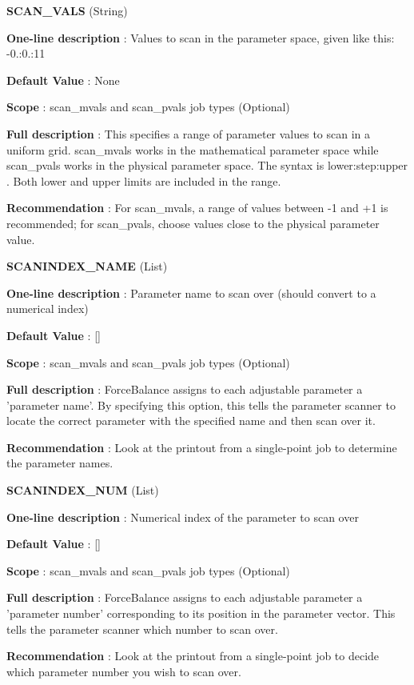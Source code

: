 \begin{DoxyItemize}
\item {\bfseries  \-S\-C\-A\-N\-\_\-\-V\-A\-L\-S } (\-String) \par
{\bfseries  \-One-\/line description }\-: \-Values to scan in the parameter space, given like this\-: -\/0.\-:0.\-:11 \par
{\bfseries  \-Default \-Value }\-: \-None \par
{\bfseries  \-Scope }\-: scan\-\_\-mvals and scan\-\_\-pvals job types (\-Optional) \par
{\bfseries  \-Full description }\-: \-This specifies a range of parameter values to scan in a uniform grid. scan\-\_\-mvals works in the mathematical parameter space while scan\-\_\-pvals works in the physical parameter space. \-The syntax is lower\-:step\-:upper . \-Both lower and upper limits are included in the range. \par
{\bfseries  \-Recommendation }\-: \-For scan\-\_\-mvals, a range of values between -\/1 and +1 is recommended; for scan\-\_\-pvals, choose values close to the physical parameter value.\end{DoxyItemize}
\begin{DoxyItemize}
\item {\bfseries  \-S\-C\-A\-N\-I\-N\-D\-E\-X\-\_\-\-N\-A\-M\-E } (\-List) \par
{\bfseries  \-One-\/line description }\-: \-Parameter name to scan over (should convert to a numerical index) \par
{\bfseries  \-Default \-Value }\-: \mbox{[}\mbox{]} \par
{\bfseries  \-Scope }\-: scan\-\_\-mvals and scan\-\_\-pvals job types (\-Optional) \par
{\bfseries  \-Full description }\-: \-Force\-Balance assigns to each adjustable parameter a 'parameter name'. \-By specifying this option, this tells the parameter scanner to locate the correct parameter with the specified name and then scan over it. \par
{\bfseries  \-Recommendation }\-: \-Look at the printout from a single-\/point job to determine the parameter names.\end{DoxyItemize}
\begin{DoxyItemize}
\item {\bfseries  \-S\-C\-A\-N\-I\-N\-D\-E\-X\-\_\-\-N\-U\-M } (\-List) \par
{\bfseries  \-One-\/line description }\-: \-Numerical index of the parameter to scan over \par
{\bfseries  \-Default \-Value }\-: \mbox{[}\mbox{]} \par
{\bfseries  \-Scope }\-: scan\-\_\-mvals and scan\-\_\-pvals job types (\-Optional) \par
{\bfseries  \-Full description }\-: \-Force\-Balance assigns to each adjustable parameter a 'parameter number' corresponding to its position in the parameter vector. \-This tells the parameter scanner which number to scan over. \par
{\bfseries  \-Recommendation }\-: \-Look at the printout from a single-\/point job to decide which parameter number you wish to scan over.\end{DoxyItemize}
